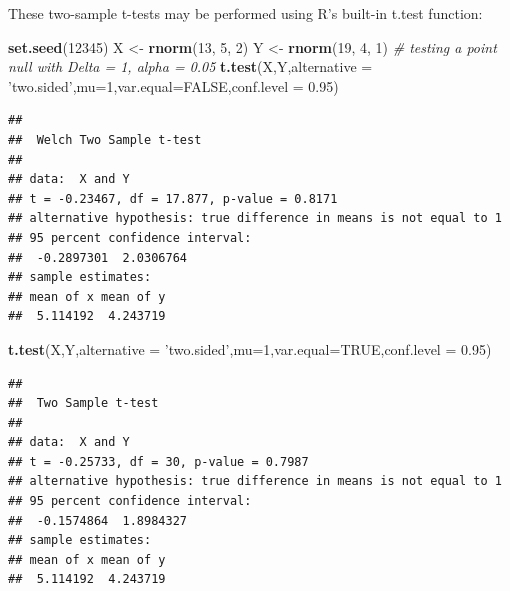 \documentclass[]{book}
\newenvironment{Shaded}{\begin{snugshade}}{\end{snugshade}}
\newcommand{\KeywordTok}[1]{\textcolor[rgb]{0.13,0.29,0.53}{\textbf{{#1}}}}
\newcommand{\DataTypeTok}[1]{\textcolor[rgb]{0.13,0.29,0.53}{{#1}}}
\newcommand{\DecValTok}[1]{\textcolor[rgb]{0.00,0.00,0.81}{{#1}}}
\newcommand{\FloatTok}[1]{\textcolor[rgb]{0.00,0.00,0.81}{{#1}}}
\newcommand{\StringTok}[1]{\textcolor[rgb]{0.31,0.60,0.02}{{#1}}}
\newcommand{\CommentTok}[1]{\textcolor[rgb]{0.56,0.35,0.01}{\textit{{#1}}}}
\newcommand{\OtherTok}[1]{\textcolor[rgb]{0.56,0.35,0.01}{{#1}}}
\newcommand{\NormalTok}[1]{{#1}}
\begin{document}
These two-sample t-tests may be performed using R's built-in t.test
function:

\begin{Shaded}
\begin{Highlighting}[]
\KeywordTok{set.seed}\NormalTok{(}\DecValTok{12345}\NormalTok{)}
\NormalTok{X <-}\StringTok{ }\KeywordTok{rnorm}\NormalTok{(}\DecValTok{13}\NormalTok{, }\DecValTok{5}\NormalTok{, }\DecValTok{2}\NormalTok{)}
\NormalTok{Y <-}\StringTok{ }\KeywordTok{rnorm}\NormalTok{(}\DecValTok{19}\NormalTok{, }\DecValTok{4}\NormalTok{, }\DecValTok{1}\NormalTok{)}
\CommentTok{# testing a point null with Delta = 1, alpha = 0.05}
\KeywordTok{t.test}\NormalTok{(X,Y,}\DataTypeTok{alternative =} \StringTok{'two.sided'}\NormalTok{,}\DataTypeTok{mu=}\DecValTok{1}\NormalTok{,}\DataTypeTok{var.equal=}\OtherTok{FALSE}\NormalTok{,}\DataTypeTok{conf.level =} \FloatTok{0.95}\NormalTok{)}
\end{Highlighting}
\end{Shaded}

\begin{verbatim}
## 
##  Welch Two Sample t-test
## 
## data:  X and Y
## t = -0.23467, df = 17.877, p-value = 0.8171
## alternative hypothesis: true difference in means is not equal to 1
## 95 percent confidence interval:
##  -0.2897301  2.0306764
## sample estimates:
## mean of x mean of y 
##  5.114192  4.243719
\end{verbatim}

\begin{Shaded}
\begin{Highlighting}[]
\KeywordTok{t.test}\NormalTok{(X,Y,}\DataTypeTok{alternative =} \StringTok{'two.sided'}\NormalTok{,}\DataTypeTok{mu=}\DecValTok{1}\NormalTok{,}\DataTypeTok{var.equal=}\OtherTok{TRUE}\NormalTok{,}\DataTypeTok{conf.level =} \FloatTok{0.95}\NormalTok{)}
\end{Highlighting}
\end{Shaded}

\begin{verbatim}
## 
##  Two Sample t-test
## 
## data:  X and Y
## t = -0.25733, df = 30, p-value = 0.7987
## alternative hypothesis: true difference in means is not equal to 1
## 95 percent confidence interval:
##  -0.1574864  1.8984327
## sample estimates:
## mean of x mean of y 
##  5.114192  4.243719
\end{verbatim}
\end{document}
